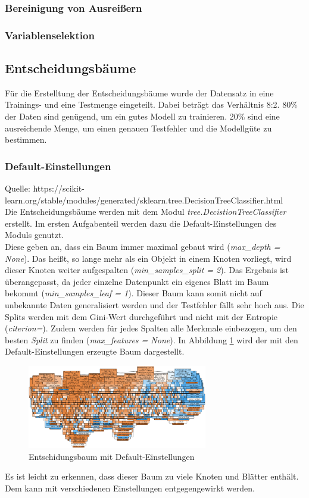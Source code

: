 \subsubsection{Bereinigung von Ausreißern}

\subsubsection{Variablenselektion}


\vspace{1cm}
\subsection{Entscheidungsbäume}
Für die Erstelltung der Entscheidungsbäume wurde der Datensatz in eine Trainings- und eine Testmenge eingeteilt. Dabei beträgt das Verhältnis 8:2. 80\% der Daten sind genügend, um ein gutes Modell zu trainieren. 20\% sind eine ausreichende Menge, um einen genauen Testfehler und die Modellgüte zu bestimmen.
\subsubsection{Default-Einstellungen}
Quelle: https://scikit-learn.org/stable/modules/generated/sklearn.tree.DecisionTreeClassifier.html\\
Die Entscheidungsbäume werden mit dem Modul \emph{tree.DecistionTreeClassifier} erstellt. Im ersten Aufgabenteil werden dazu die Default-Einstellungen des Moduls genutzt.\\
\noindent \hspace*{7mm}
Diese geben an, dass ein Baum immer maximal gebaut wird (\emph{max\_depth = None}). Das heißt, so lange mehr als ein Objekt in einem Knoten vorliegt, wird dieser Knoten weiter aufgespalten (\emph{min\_samples\_split = 2}). Das Ergebnis ist überangepasst, da jeder einzelne Datenpunkt ein eigenes Blatt im Baum bekommt (\emph{min\_samples\_leaf = 1}). Dieser Baum kann somit nicht auf unbekannte Daten generalisiert werden und der Testfehler fällt sehr hoch aus. Die Splits werden mit dem Gini-Wert durchgeführt und nicht mit der Entropie (\emph{citerion=}). Zudem werden für jedes Spalten alle Merkmale einbezogen, um den besten \emph{Split} zu finden (\emph{max\_features = None}). In Abbildung \ref{fig:treedefault} wird der mit den Default-Einstellungen erzeugte Baum dargestellt.
\begin{figure}[h]
	\centering
	\includegraphics[width = 0.7\textwidth]{Bilder/treedefault}
	\caption{Entschidungsbaum mit Default-Einstellungen}
	\label{fig:treedefault}
\end{figure}
Es ist leicht zu erkennen, dass dieser Baum zu viele Knoten und Blätter enthält. Dem kann mit verschiedenen Einstellungen entgegengewirkt werden.
